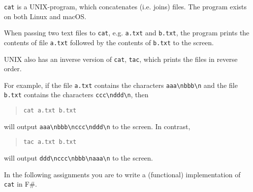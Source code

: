 \lstinline[language=console]{cat} is a UNIX-program, which concatenates (i.e. joins) files. The program exists on both Linux and macOS.

When passing two text files to \lstinline[language=console]{cat}, e.g. \lstinline[language=console]{a.txt} and \lstinline[language=console]{b.txt}, the program prints the contents of file \lstinline[language=console]{a.txt} followed by the contents of \lstinline[language=console]{b.txt} to the screen.
  
UNIX also has an inverse version of \texttt{cat}, \texttt{tac}, which prints the files in reverse order.

For example, if the file \lstinline[language=console]{a.txt} contains the characters \lstinline[language=console]{aaa\nbbb\n} and the file \lstinline[language=console]{b.txt} contains the characters \lstinline[language=console]{ccc\nddd\n}, then
\begin{quote}
\lstinline[language=console]{cat a.txt b.txt}
\end{quote}
will output \lstinline[language=console]{aaa\nbbb\nccc\nddd\n} to the screen. In contrast,
\begin{quote}
\lstinline[language=console]{tac a.txt b.txt}
\end{quote}
will output \lstinline[language=console]{ddd\nccc\nbbb\naaa\n} to the screen.

In the following assignments you are to write a (functional) implementation of \lstinline[language=console]{cat} in F\#.
